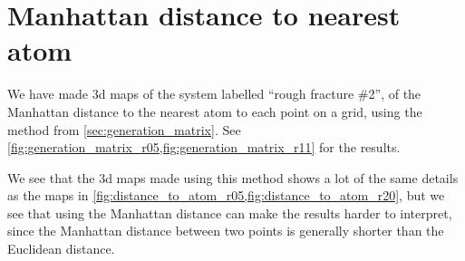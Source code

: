 \section{Manhattan distance to nearest atom}
%
We have made 3d maps of the system labelled ``rough fracture \#2'', of the Manhattan distance to the nearest atom to each point on a grid, using the method from \cref{sec:generation_matrix}. See \cref{fig:generation_matrix_r05,fig:generation_matrix_r11} for the results.

We see that the 3d maps made using this method shows a lot of the same details as the maps in \cref{fig:distance_to_atom_r05,fig:distance_to_atom_r20}, but we see that using the Manhattan distance can make the results harder to interpret, since the Manhattan distance between two points is generally shorter than the Euclidean distance.
%
%

